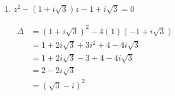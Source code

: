 \documentclass[12pt,a4paper]{article}
\begin{document}
\begin{enumerate}
\begin{enumerate}
        Or $-8 - 6i = -(8 + 6i) = [i(3 + i)]^2 = (-1 + 3i)^2$, donc :
        
        $
        \begin{aligned}
            \Delta &= [3(-1 + 3i)]^2\\
            &= (-3 + 9i)^2
        \end{aligned}
        $
        
        Une racine carrée de $\Delta$ est $\delta = -3 + 9i$.
        
        $
        \begin{aligned}
            z_1 &= \frac{7 - i - (-3 + 9i)}{2(3 + i)}\\
            &= \frac{7 - i + 3 - 9i}{2(3 + i)}\\
            &= \frac{10 - 10i}{2(3 + i)}\\
            &= \frac{5 - 5i}{3 + i}\\
            &= \frac{(5 - 5i)(3 - i)}{9 + 1}\\
            &= \frac{15 - 5i - 15i - 5}{10}\\
            &= \frac{10 - 20i}{10}\\
            &= \mathbf{1 - 2i}
        \end{aligned}
        $
        
        $
        \begin{aligned}
            z_2 &= \frac{7 - i + (-3 + 9i)}{2(3 + i)}\\
            &= \frac{4 + 8i}{2(3 + i)}\\
            &= \frac{2 + 4i}{3 + i}\\
            &= \frac{(2 + 4i)(3 - i)}{9 + 1}\\
            &= \frac{6 - 2i + 12i + 4}{10}\\
            &= \frac{10 + 10i}{10}\\
            &= \mathbf{1 + i}
        \end{aligned}
        $
        
        D'où $\mathcal{S} = \left\{\mathbf{1 - 2i \,;\, 1 + i}\right\}$.

        \item $z^2 - (1 + i\sqrt{3})z - 1 + i\sqrt{3} = 0$
        
        $
        \begin{aligned}
            \Delta &= (1 + i\sqrt{3})^2 - 4(1)(-1 + i\sqrt{3})\\
            &= 1 + 2i\sqrt{3} + 3i^2 + 4 - 4i\sqrt{3}\\
            &= 1 + 2i\sqrt{3} - 3 + 4 - 4i\sqrt{3}\\
            &= 2 - 2i\sqrt{3}\\
            &= (\sqrt{3} - i)^2
        \end{aligned}
        $
        

\end{enumerate}
\end{enumerate}
\end{document}
